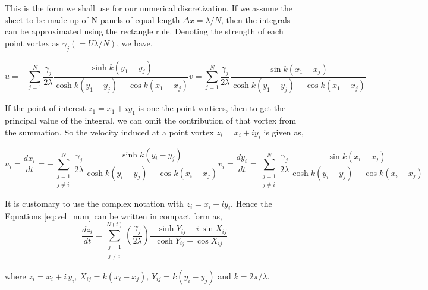 \documentclass{article}
\begin{document}
This is the form we shall use for our numerical discretization. If we assume the sheet to be made up of N panels of equal length $\Delta x=\lambda/N$, then the integrals can be approximated using the rectangle rule. Denoting the strength of each point vortex as $\gamma_j (=U\lambda/N)$, we have,

\begin{subequations}\label{eq:vel_4}
\begin{equation}
u= -\sum_{j=1}^{N} \frac{\gamma_j}{2\lambda} \frac{\sinh k(y_1-y_j)}{\cosh k(y_1-y_j)-\cos k(x_1-x_j)}
\end{equation}
\begin{equation}
v= \sum_{j=1}^{N} \frac{\gamma_j}{2\lambda} \frac{\sin k(x_1-x_j)}{\cosh k(y_1-y_j)-\cos k(x_1-x_j)}
\end{equation}
\end{subequations}

If the point of interest $z_1=x_1+iy_1$ is one the point vortices, then to get the principal value of the integral, we can omit the contribution of that vortex from the summation. So the velocity induced at a point vortex $z_i=x_i+iy_i$ is given as,

\begin{subequations}\label{eq:vel_num}
\begin{equation}
u_i= \frac{dx_i}{dt}=-\sum_{\substack{j=1 \\ j\neq i}}^{N} \frac{\gamma_j}{2\lambda} \frac{\sinh k(y_i-y_j)}{\cosh k(y_i-y_j)-\cos k(x_i-x_j)}
\end{equation}
\begin{equation}
v_i= \frac{dy_i}{dt}= \sum_{\substack{j=1 \\ j\neq i}}^{N} \frac{\gamma_j}{2\lambda} \frac{\sin k(x_i-x_j)}{\cosh k(y_i-y_j)-\cos k(x_i-x_j)}
\end{equation}
\end{subequations}

It is customary to use the complex notation with $z_i=x_i+iy_i$. Hence the Equations \eqref{eq:vel_num} can be written in compact form as,
\begin{equation}\label{eq:vel_num_complex}
\frac{dz_i}{dt}=\sum\limits_{\substack{j=1 \\ j\neq i}}^{N(t)}\left(\frac{\gamma_j}{2\lambda}\right)
\frac{-\sinh{Y_{ij}}+i\, \sin{X_{ij}}}{\cosh{Y_{ij}}-\cos{X_{ij}}}
\end{equation}

where $z_i=x_i+i\,y_i, \, X_{ij}=k(x_i-x_j), \, Y_{ij}=k(y_i-y_j)$ and $k=2\pi/\lambda$.
\end{document}
